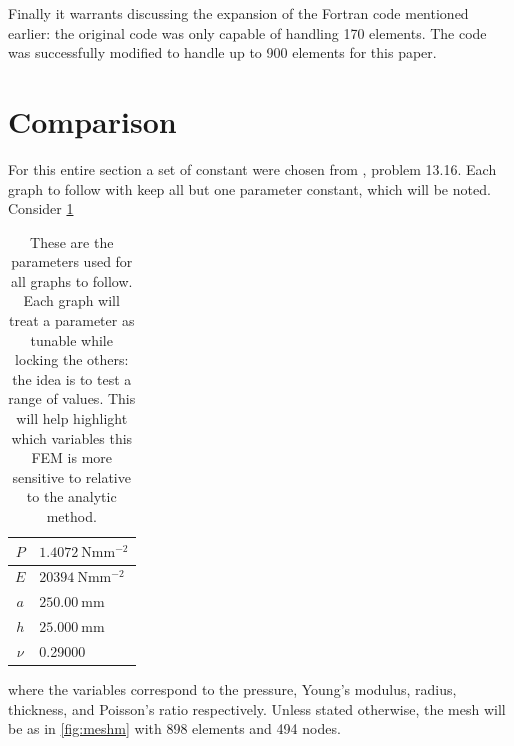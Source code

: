 \documentclass[12pt,times,twocolumn,3p]{elsarticle}
\begin{document}
Finally it warrants discussing the expansion of the Fortran code mentioned earlier:
the original code was only capable of handling 170 elements. The code was successfully
modified to handle up to 900 elements for this paper.

\section{Comparison} \label{sec:comp}
For this entire section a set of constant were chosen from \cite{boresi}, problem
13.16. Each graph to follow with keep all but one parameter constant, which will
be noted. Consider \cref{tab:params}
\begin{table}[ht]
    \centering
    \begin{tabular}{ ||c|l|| }
        \hline
        $P$ & $\SI{1.4072}{\newton\milli\meter^{-2}}$ \\
        \hline
        $E$ & $\SI{20394}{\newton\milli\meter^{-2}}$ \\
        \hline
        $a$ & $\SI{250.00}{\milli\meter}$ \\
        \hline
        $h$ & $\SI{25.000}{\milli\meter}$ \\
        \hline
        $\nu$ & 0.29000 \\
        \hline
    \end{tabular}
    \caption{These are the parameters used for all graphs to follow. Each graph
    will treat a parameter as tunable while locking the others: the idea is to
    test a range of values. This will help highlight which variables this FEM
    is more sensitive to relative to the analytic method.}
    \label{tab:params}
\end{table}
where the variables correspond to the pressure, Young's modulus, radius, thickness,
and Poisson's ratio respectively. Unless stated otherwise, the mesh will be as in
\cref{fig:meshm} with 898 elements and 494 nodes.
\end{document}
